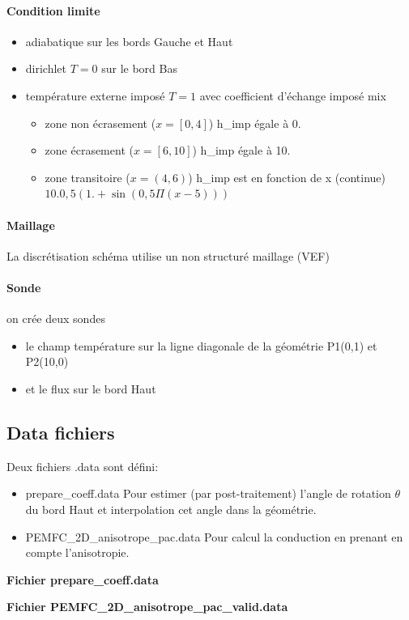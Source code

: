 \documentclass{article}
\begin{document}
	\paragraph{Condition limite}
	\begin{itemize}
		\item adiabatique sur les bords Gauche et Haut \\
		\item dirichlet $ T = 0 $ sur le bord Bas \\
		\item température externe imposé $ T = 1 $ avec coefficient d'échange imposé mix \\
		\begin{itemize}
			\item zone non écrasement ($ x = [0, 4] $) h\_imp égale à 0. \\
			\item zone écrasement ($x = [6, 10]$) h\_imp égale à 10. \\
			\item zone transitoire ($x = (4, 6)$) h\_imp est en fonction de x (continue)
			 $ 10.0,5(1.+ \sin(0,5\Pi(x-5))) $ \\
		\end{itemize}
	\end{itemize} \par

	\paragraph{Maillage}
	La discrétisation schéma utilise un non structuré maillage (VEF) \par
	
	\paragraph{Sonde}
	on crée deux sondes
	\begin{itemize}
		\item  le champ température sur la ligne diagonale de la géométrie P1(0,1) et P2(10,0)
		\item et le flux sur le bord Haut
	\end{itemize}
	
	\subsection*{Data fichiers}
	Deux fichiers .data sont défini:
	\begin{itemize}
		\item prepare\_coeff.data Pour estimer (par post-traitement) l'angle de rotation $\theta$ du bord Haut et interpolation cet angle dans la géométrie.
		\item PEMFC\_2D\_anisotrope\_pac.data Pour calcul la conduction en prenant en compte l'anisotropie.
	\end{itemize}


	\textbf{Fichier prepare\_coeff.data}
		
		
	\textbf{Fichier PEMFC\_2D\_anisotrope\_pac\_valid.data}
		
\end{document}
